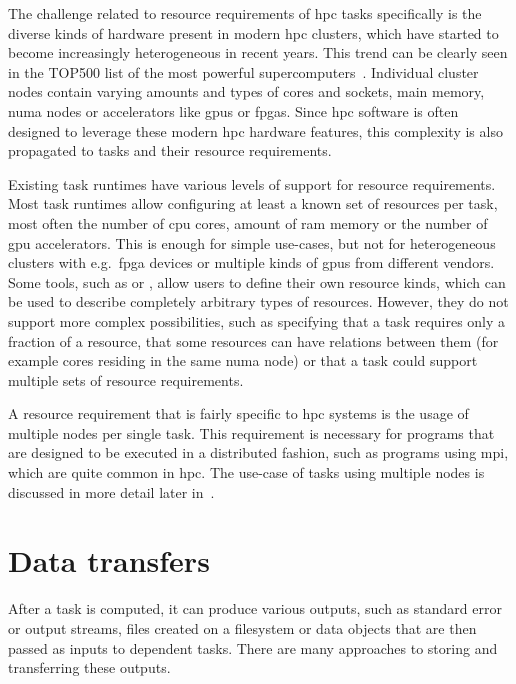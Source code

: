The challenge related to resource requirements of \gls{hpc} tasks specifically is
the diverse kinds of hardware present in modern \gls{hpc} clusters, which have
started to become increasingly heterogeneous in recent years. This trend can be clearly seen in the
TOP500 list of the most powerful supercomputers~\cite{top500analysis}. Individual cluster
nodes contain varying amounts and types of cores and sockets, main memory,
\gls{numa} nodes or accelerators like \glspl{gpu} or
\glspl{fpga}. Since \gls{hpc} software is often designed to
leverage these modern \gls{hpc} hardware features, this complexity is also
propagated to tasks and their resource requirements.

Existing task runtimes have various levels of support for resource requirements. Most task
runtimes allow configuring at least a known set of resources per task, most often the number of
\gls{cpu} cores, amount of \gls{ram} memory or the number of \gls{gpu} accelerators. This is
enough for simple use-cases, but not for heterogeneous clusters with e.g.\ \gls{fpga} devices or
multiple kinds of \glspl{gpu} from different vendors. Some tools, such as \dask{} or \snakemake{},
allow users to define their own resource kinds, which can be used to describe completely
arbitrary types of resources. However, they do not support more complex possibilities, such as
specifying that a task requires only a fraction of a resource, that some resources can have
relations between them (for example cores residing in the same \gls{numa} node) or that a task
could support multiple sets of resource requirements.


A resource requirement that is fairly specific to \gls{hpc} systems is the usage
of multiple nodes per single task. This requirement is necessary for programs that are designed to
be executed in a distributed fashion, such as programs using \gls{mpi}, which are
quite common in \gls{hpc}. The use-case of tasks using multiple nodes is
discussed in more detail later in~.

\section{Data transfers}
After a task is computed, it can produce various outputs, such as standard error or output streams,
files created on a filesystem or data objects that are then passed as inputs to dependent tasks.
There are many approaches to storing and transferring these outputs.

